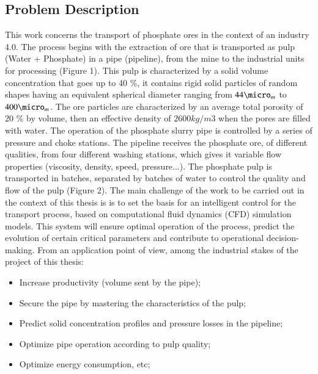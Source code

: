\documentclass[review,3p,times,12pt]{elsarticle}
\begin{document}
\subsection{Problem Description }
This work concerns the transport of phosphate ores in the context of an industry 4.0. The process begins with the extraction of ore that is transported as pulp (Water + Phosphate) in a pipe (pipeline), from the mine to the industrial units for processing (Figure 1). This pulp is characterized by a solid volume concentration that goes up  to 40 $\%$, it contains rigid solid particles of random shapes having an equivalent spherical diameter ranging from $44 \micro_m$ to $400 \micro_m$. The ore particles are characterized by an average total porosity of 20 $\%$ by volume, then an effective density of $2600 kg/m3$ when the pores are filled with water. The operation of the phosphate slurry pipe is controlled by a series of pressure and choke stations. The pipeline receives the phosphate ore, of different qualities, from four different washing stations, which gives it variable flow properties (viscosity, density, speed, pressure...). The phosphate pulp is transported in batches, separated by batches of water to control the quality and flow of the pulp (Figure 2). The main challenge of the work to be carried out in the context of this thesis is is to set the basis for an intelligent control for the transport process, based on computational fluid dynamics (CFD) simulation models. This system will ensure optimal operation of the process, predict the evolution of certain critical parameters and contribute to operational decision-making. From an application point of view, among the industrial stakes of the project of this thesis:
\begin{itemize}
    \item Increase productivity (volume sent by the pipe);
    \item Secure the pipe by mastering the characteristics of the pulp;
    \item Predict solid concentration profiles and pressure losses in the pipeline;
    \item Optimize pipe operation according to pulp quality;
    \item Optimize energy consumption, etc;
\end{itemize}
\end{document}
